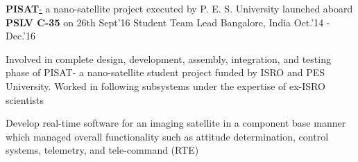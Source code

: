 \begin{cventries}
	\cventry
	{\textbf{PISAT}\href{http://pisat.pes.edu/}- a nano-satellite project executed by P. E. S. University launched aboard \textbf{PSLV C-35} on 26th Sept'16}
	{Student Team Lead}
	{Bangalore, India}
	{Oct.'14 - Dec.'16}
	{
		\begin{cvitems}
		\item{Involved in complete design, development, assembly, integration, and testing phase of PISAT- a nano-satellite student project funded by ISRO and PES University. Worked in following subsystems under the expertise of ex-ISRO scientists}
		\item{Develop real-time software for an imaging satellite in a component base manner which managed overall functionality such as attitude determination, control systems, telemetry, and tele-command (RTE)}
		\end{cvitems}
	}
\end{cventries}
